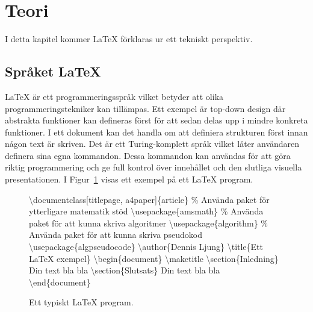 \section{Teori}
I detta kapitel kommer {\LaTeX} förklaras ur ett tekniskt perspektiv. 

\subsection{Språket {\LaTeX}} 
{\LaTeX} är ett programmeringsspråk vilket betyder att olika programmeringstekniker kan tillämpas. Ett exempel är top-down design där abstrakta funktioner kan defineras först för att sedan delas upp i mindre konkreta funktioner. I ett dokument kan det handla om att definiera strukturen först innan någon text är skriven. \citep{latexandfriends}
\newline
\newline
Det är ett Turing-komplett språk vilket låter användaren definera sina egna kommandon. Dessa kommandon kan användas för att göra riktig programmering och ge full kontrol över innehållet och den slutliga visuella presentationen. \citep{latexandfriends}
\newline
\newline
I Figur~\ref{fig:latexexempel} visas ett exempel på ett {\LaTeX} program. 
  
\begin{figure}[ht]
	\noindent\makebox[\linewidth]{\rule{\textwidth}{0.4pt}}
	\textbackslash documentclass[titlepage, a4paper]\{article\}
	\newline
	\newline
	\% Använda paket för ytterligare matematik stöd
	\newline
	\textbackslash usepackage\{amsmath\}
	\newline
	\% Använda paket för att kunna skriva algoritmer
	\newline
	\textbackslash usepackage\{algorithm\}
	\newline
	\% Använda paket för att kunna skriva pseudokod
	\newline
	\textbackslash usepackage\{algpseudocode\}
	\newline
	\newline
	\textbackslash author\{Dennis Ljung\}
	\newline
	\textbackslash title\{Ett {\LaTeX} exempel\}
	\newline
	\newline
	\textbackslash begin\{document\}
	\newline
	\textbackslash maketitle
	\newline
	\textbackslash section\{Inledning\}
	\newline
	Din text bla bla
	\newline
	\textbackslash section\{Slutsats\}
	\newline
	Din text bla bla
	\newline
	\textbackslash end\{document\}
	\newline
	\noindent\makebox[\linewidth]{\rule{\textwidth}{0.4pt}}
\caption{Ett typiskt {\LaTeX} program.}
\label{fig:latexexempel}
\end{figure} 


